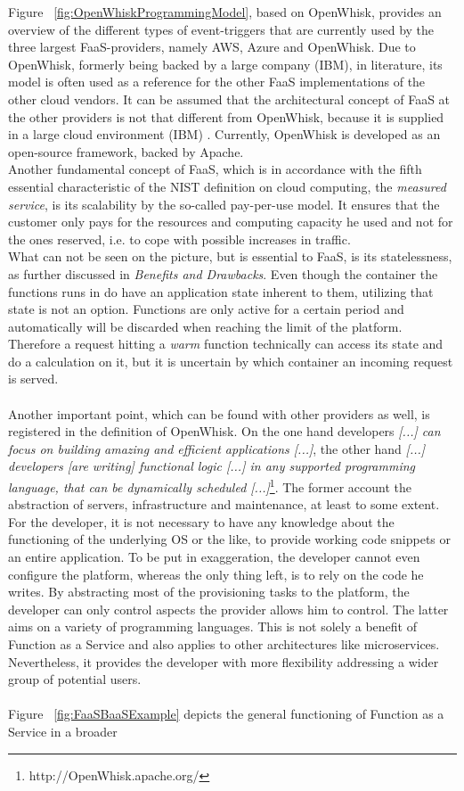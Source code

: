 \documentclass[a4paper,twoside,11pt, pagesize]{scrartcl}
\begin{document}
\begin{spacing}{1.2}
Figure ~\ref{fig:OpenWhiskProgrammingModel}, based on OpenWhisk, provides an overview of the different types of event-triggers that are currently used by the three largest FaaS-providers, namely AWS, Azure and OpenWhisk. Due to OpenWhisk, formerly being backed by a large company (IBM), in literature, its model is often used as a reference for the other FaaS implementations of the other cloud vendors. It can be assumed that the architectural concept of FaaS at the other providers is not that different from OpenWhisk, because it is supplied in a large cloud environment (IBM) \cite{van2019spec}. Currently, OpenWhisk is developed as an open-source framework, backed by Apache. \\ Another fundamental concept of FaaS, which is in accordance with the fifth essential characteristic of the NIST definition on cloud computing, the \textit{measured service}, is its scalability by the so-called pay-per-use model. It ensures that the customer only pays for the resources and computing capacity he used and not for the ones reserved, i.e. to cope with possible increases in traffic.\\ What can not be seen on the picture, but is essential to FaaS, is its statelessness, as further discussed in \textit{Benefits and Drawbacks}. Even though the container the functions runs in do have an application state inherent to them, utilizing that state is not an option. Functions are only active for a certain period and automatically will be discarded when reaching the limit of the platform. Therefore a request hitting a \textit{warm} function technically can access its state and do a calculation on it, but it is uncertain by which container an incoming request is served.\\\\ Another important point, which can be found with other providers as well, is registered in the definition of OpenWhisk. On the one hand developers \glqq \textit{[...] can focus on building amazing and efficient applications [...]}\grqq{}, the other hand \glqq \textit{[...] developers [are writing] functional logic [...] in any supported programming language, that can be dynamically scheduled [...]}\grqq{}\footnote{http://OpenWhisk.apache.org/}. The former account the abstraction of servers, infrastructure and maintenance, at least to some extent. For the developer, it is not necessary to have any knowledge about the functioning of the underlying OS or the like, to provide working code snippets or an entire application. To be put in exaggeration, the developer cannot even configure the platform, whereas the only thing left, is to rely on the code he writes. By abstracting most of the provisioning tasks to the platform, the developer can only control aspects the provider allows him to control. The latter aims on a variety of programming languages. This is not solely a benefit of Function as a Service and also applies to other architectures like microservices. Nevertheless, it provides the developer with more flexibility addressing a wider group of potential users.\\\\ Figure ~\ref{fig:FaaSBaaSExample} depicts the general functioning of Function as a Service in a broader 
\end{spacing}
\end{document}

